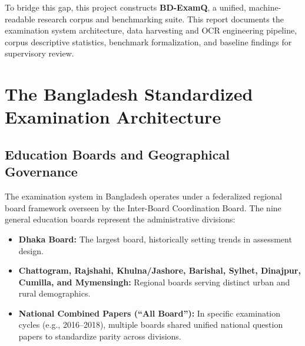 \documentclass[11pt,a4paper]{article}
\begin{document}
To bridge this gap, this project constructs \textbf{BD-ExamQ}, a unified, machine-readable research corpus and benchmarking suite. This report documents the examination system architecture, data harvesting and OCR engineering pipeline, corpus descriptive statistics, benchmark formalization, and baseline findings for supervisory review.

\clearpage

\section{The Bangladesh Standardized Examination Architecture}
\label{sec:exam_architecture}

\subsection{Education Boards and Geographical Governance}
The examination system in Bangladesh operates under a federalized regional board framework overseen by the Inter-Board Coordination Board. The nine general education boards represent the administrative divisions:
\begin{itemize}[noitemsep,topsep=2pt]
    \item \textbf{Dhaka Board:} The largest board, historically setting trends in assessment design.
    \item \textbf{Chattogram, Rajshahi, Khulna/Jashore, Barishal, Sylhet, Dinajpur, Cumilla, and Mymensingh:} Regional boards serving distinct urban and rural demographics.
    \item \textbf{National Combined Papers (``All Board''):} In specific examination cycles (e.g., 2016--2018), multiple boards shared unified national question papers to standardize parity across divisions.
\end{itemize}
\end{document}
